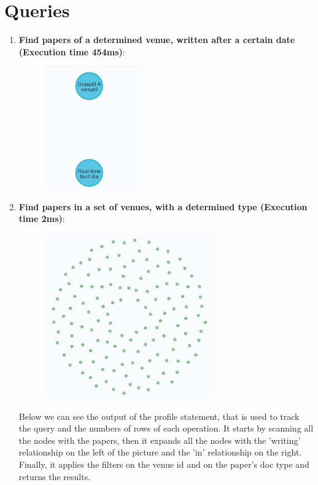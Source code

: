 \documentclass{Configuration_Files/PoliMi3i_thesis}
\begin{document}
\section{Queries}
\begin{enumerate}
    \item \textbf{Find papers of a determined venue, written after a certain date (Execution time 454ms)}:
    
     \begin{figure}[H]
    \centering
    \includegraphics[width=0.4\textwidth]{Images/queries/query_1.jpg}\end{figure}
    \item \textbf{Find papers in a set of venues, with a determined type (Execution time 2ms)}:
    
     \begin{figure}[H]
    \centering
    \includegraphics[width=0.7\textwidth]{Images/queries/query_2.jpg}
    \end{figure}
  Below we can see the output of the profile statement, that is used to track the query and the numbers of rows of each operation. It starts by scanning all the nodes with the papers, then it expands all the nodes with the 'writing' relationship on the left of the picture and the 'in' relationship on the right. Finally, it applies the filters on the venue id and on the paper's doc type and returns the results.

\end{enumerate}
\end{document}
